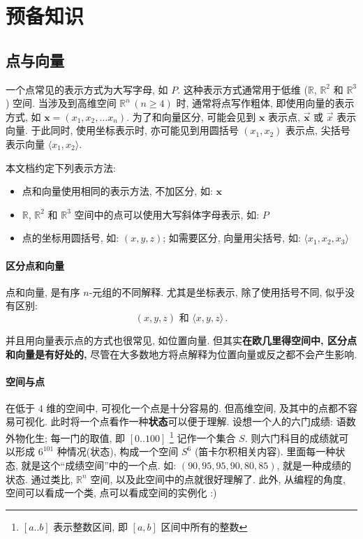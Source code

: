 \documentclass[UTF8]{ctexart}
\newcommand{\ve}[1]{\boldsymbol{\mathbf{#1}}}
\newcommand{\R}{\mathbb R}
\begin{document}
\tableofcontents

\newpage
\section{预备知识}
\subsection{点与向量}
一个点常见的表示方式为大写字母, 如 $ P $. 这种表示方式通常用于低维 ($ \R $, $ \R^2 $ 和 $ \R^3 $) 空间. 当涉及到高维空间 $ \R^n\, (n \geqslant 4) $ 时, 通常将点写作粗体, 即使用向量的表示方式, 如 $ \ve x = (x_1, x_2, \dots x_n) $. 为了和向量区分, 可能会见到 $ \ve x $ 表示点, $ \vec{\ve x} $ 或 $ \vec x $ 表示向量. 于此同时, 使用坐标表示时, 亦可能见到用圆括号 $ (x_1, x_2) $ 表示点, 尖括号表示向量 $ \langle x_1, x_2 \rangle $.

本文档约定下列表示方法:
\begin{itemize}
    \item 点和向量使用相同的表示方法, 不加区分, 如: $ \ve x $
    \item $ \R $, $ \R^2 $ 和 $ \R^3 $ 空间中的点可以使用大写斜体字母表示, 如: $ P $
    \item 点的坐标用圆括号, 如: $ (x, y, z) $; 如需要区分, 向量用尖括号, 如: $ \langle x_1, x_2, x_3 \rangle $
\end{itemize}

\paragraph{区分点和向量}
点和向量, 是有序 $ n $-元组的不同解释. 尤其是坐标表示, 除了使用括号不同, 似乎没有区别:\[ (x, y, z) \text{ 和 } \langle x, y, z \rangle \,.\]

并且用向量表示点的方式也很常见, 如位置向量. 但其实\textbf{在欧几里得空间中, 区分点和向量是有好处的,} 尽管在大多数地方将点解释为位置向量或反之都不会产生影响.

\paragraph{空间与点} 
在低于 $ 4 $ 维的空间中, 可视化一个点是十分容易的. 但高维空间, 及其中的点都不容易可视化. 此时将一个点看作一种\textbf{状态}可以便于理解. 设想一个人的六门成绩: 语数外物化生; 每一门的取值, 即 $ [0..100] $ \footnote{$ [a..b] $ 表示整数区间, 即 $ [a, b] $ 区间中所有的整数} 记作一个集合 $ S $. 则六门科目的成绩就可以形成 $ 6^{101} $ 种情况(状态), 构成一个空间 $ S^6 $ (笛卡尔积相关内容). 里面每一种状态, 就是这个``成绩空间''中的一个点. 如: $ (90, 95, 95, 90, 80, 85) $, 就是一种成绩的状态. 通过类比, $ \R^n $ 空间, 以及此空间中的点就很好理解了. 此外, 从编程的角度, 空间可以看成一个类, 点可以看成空间的实例化 :)
\end{document}
